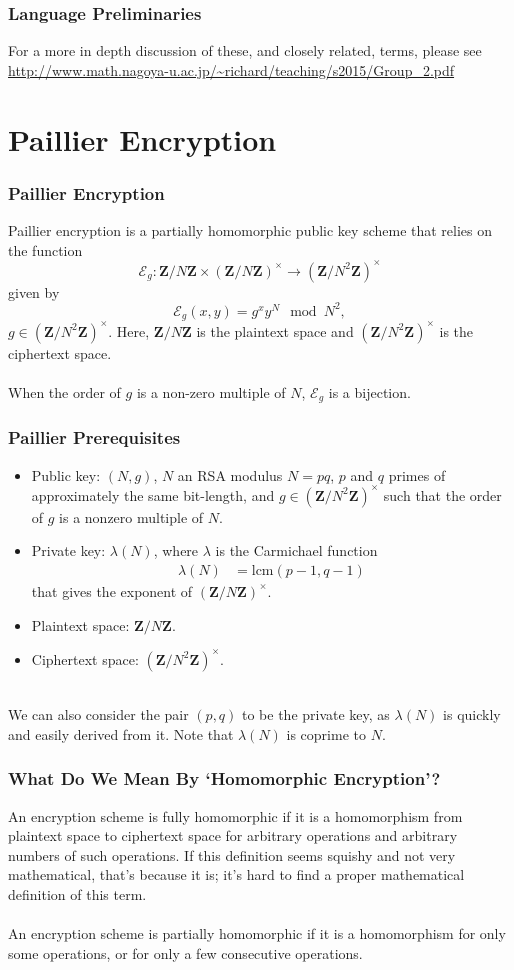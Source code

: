 \documentclass{beamer}
\makeatletter
\newcommand{\Z}{\ensuremath{\mathbf{Z}}}
\newcommand{\zmodn}{\ensuremath{\Z/N\Z}}
\newcommand{\zmodntunits}{\ensuremath{\left(\Z/N^{2}\Z\right)^{\times}}}
\newcommand{\lcm}{\ensuremath{\text{lcm}}}
\DeclareRobustCommand*{\&}{%
  \nfss@text{%
    \fontfamily{LinuxBiolinumT-TLF}%
    \selectfont
    \symbol{`\&}%
  }%
}
\makeatother
\begin{document}
\begin{frame}
  \frametitle{Language Preliminaries}
  For a more in depth discussion of these, and closely related, terms, please
  see 
  \mbox{\scriptsize \url{http://www.math.nagoya-u.ac.jp/~richard/teaching/s2015/Group_2.pdf}}
\end{frame}

\section{Paillier Encryption}
\begin{frame}
\frametitle{Paillier Encryption}
Paillier encryption is a partially homomorphic public key scheme that relies on
the function $$\mathcal{E}_g:\zmodn\times(\zmodn)^\times\rightarrow
\zmodntunits$$ given by $$\mathcal{E}_g(x,y) = g^x y^N \mod N^2,$$
$g\in\zmodntunits$. Here, $\zmodn$ is the plaintext space and $\zmodntunits$ is
the ciphertext space.\\~\\
When the order of $g$ is a non-zero multiple of $N$, $\mathcal{E}_g$ is a bijection.
\end{frame}

\begin{frame}
  \frametitle{Paillier Prerequisites}
\begin{itemize}
  \item Public key: $(N,g)$, $N$ an RSA modulus $N=pq$, $p$ and $q$ primes of
    approximately the same bit-length, and $g\in \zmodntunits$ such that the
    order of $g$ is a nonzero multiple of $N$. 
  \item Private key: $\lambda(N)$, where $\lambda$ is the Carmichael function
    \begin{align*}
      \lambda(N) &= \lcm(p-1,q-1)
    \end{align*}
  that gives the exponent of $(\zmodn)^\times$.
  \item Plaintext space: \zmodn.
  \item Ciphertext space: \zmodntunits.
\end{itemize}
~\\
{\footnotesize We can also consider the pair $(p,q)$ to be the private key, as $\lambda(N)$ is
quickly and easily derived from it. Note that $\lambda(N)$ is coprime to $N$.}
\end{frame}

\begin{frame}
  \frametitle{What Do We Mean By `Homomorphic Encryption'?}
  An encryption scheme is fully homomorphic if it is a homomorphism from
  plaintext space to ciphertext space for arbitrary operations and arbitrary
  numbers of such operations. If this definition seems squishy and not very
  mathematical, that's because it is; it's hard to find a proper mathematical
  definition of this term.\\~\\

  An encryption scheme is partially homomorphic if it is a homomorphism for
  only some operations, or for only a few consecutive operations.\\~\\
\end{frame}
\end{document}
